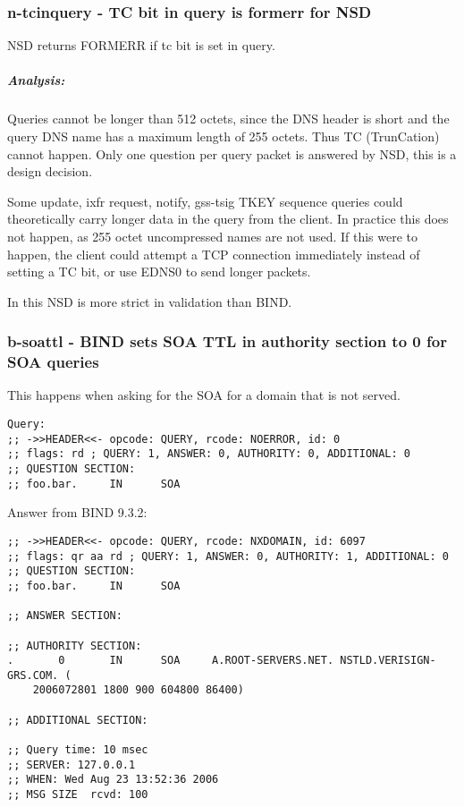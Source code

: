 \documentclass[twoside,titlepage,english]{nlnetlabs}
\begin{document}
\subsubsection{n-tcinquery - TC bit in query is formerr for NSD}
\label{n-tcinquery}

NSD returns FORMERR if tc bit is set in query.

\vspace{-8pt}\subparagraph{Analysis:}

Queries cannot be longer than 512 octets, since the DNS header is short
and the query DNS name has a maximum length of 255 octets. Thus 
TC (TrunCation) cannot happen. Only one question per query packet is 
answered by NSD, this is a design decision.

Some update, ixfr request, notify, gss-tsig TKEY sequence queries could 
theoretically carry longer data in the query from the client. In practice
this does not happen, as 255 octet uncompressed names are not used.
If this were to happen, the client could attempt a TCP connection
immediately instead of setting a TC bit, or use EDNS0 to send longer packets.

In this NSD is more strict in validation than BIND.


\subsubsection{b-soattl - BIND sets SOA TTL in authority section to 0 for SOA queries}
\label{b-soattl}

This happens when asking for the SOA for a domain that is not served.

\footnotesize
\begin{verbatim}
Query:
;; ->>HEADER<<- opcode: QUERY, rcode: NOERROR, id: 0
;; flags: rd ; QUERY: 1, ANSWER: 0, AUTHORITY: 0, ADDITIONAL: 0
;; QUESTION SECTION:
;; foo.bar.     IN      SOA
\end{verbatim}
\normalsize


Answer from BIND 9.3.2:

\footnotesize
\begin{verbatim}
;; ->>HEADER<<- opcode: QUERY, rcode: NXDOMAIN, id: 6097
;; flags: qr aa rd ; QUERY: 1, ANSWER: 0, AUTHORITY: 1, ADDITIONAL: 0
;; QUESTION SECTION:
;; foo.bar.     IN      SOA

;; ANSWER SECTION:

;; AUTHORITY SECTION:
.       0       IN      SOA     A.ROOT-SERVERS.NET. NSTLD.VERISIGN-GRS.COM. (
	2006072801 1800 900 604800 86400)

;; ADDITIONAL SECTION:

;; Query time: 10 msec
;; SERVER: 127.0.0.1
;; WHEN: Wed Aug 23 13:52:36 2006
;; MSG SIZE  rcvd: 100
\end{verbatim}
\normalsize
\end{document}
